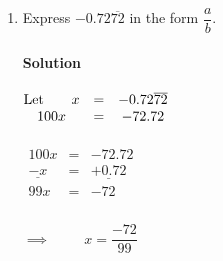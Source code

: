 \documentclass[11pt,a4paper]{article}
\begin{document}
\begin{enumerate}
\pagebreak
\textbf{Solution}\\
Let $x=4.75$, multiply by 100 both sides, we get $100x=475$\\\\   
$\implies \hspace{0.7cm} x=\dfrac{475}{100}\hspace{0.7cm} \implies \hspace{0.7cm} x=\dfrac{19}{4}$.\\\\

\item Express $-0.72\overline{72}$ in the form $\dfrac{a}{b}$.\\\\
\textbf{Solution}\\\\
$
\begin{matrix}
\text{Let}\hspace{0.7cm} x &= &-0.72\overline{72}\\
100x & = & -72.72\\
\end{matrix} 
$ \\\\


$
\begin{matrix}
100x & = & -72.72\\
\underline{-x} & = & \underline{+ 0.72}\\
99x & = & -72\\
\end{matrix}
$ \\\\

$\implies \hspace{1cm} x=\dfrac{-72}{99}$\\\\      
\end{enumerate}
\end{document}
